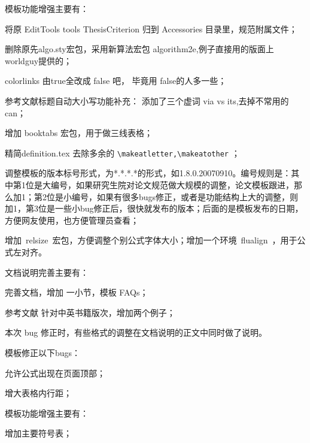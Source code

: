 模板功能增强主要有：
\begin{hitlist}
  \item 将原 EditTools tools ThesisCriterion 归到 Accessories 目录里，规范附属文件；
  \item 删除原先algo.sty宏包，采用新算法宏包 algorithm2e,例子直接用的版面上worldguy提供的；
  \item colorlinks 由true全改成 false 吧， 毕竟用 false的人多一些；
  \item 参考文献标题自动大小写功能补充： 添加了三个虚词 via vs its,去掉不常用的 can；
  \item 增加 booktabs 宏包，用于做三线表格；
  \item 精简definition.tex 去除多余的 \verb|\makeatletter,\makeatother| ；
  \item 调整模板的版本标号形式，为*.*.*.*的形式，如1.8.0.20070910。编号规则是：其中第1位是大编号，如果研究生院对论文规范做大规模的调整，论文模板跟进，那么加1；第2位是小编号，如果有很多bugs修正，或者是功能结构上大的调整，则加1，第3位是一些小bug修正后，很快就发布的版本；后面的是模板发布的日期，方便网友使用，也方便管理员查看；
  \item 增加~relsize~宏包，方便调整个别公式字体大小；增加一个环境~flualign~，用于公式左对齐。
\end{hitlist}

文档说明完善主要有：
\begin{hitlist}
  \item 完善文档，增加 一小节，模板 FAQs；
  \item 参考文献 针对中英书籍版次，增加两个例子；
  \item 本次 bug 修正时，有些格式的调整在文档说明的正文中同时做了说明。
\end{hitlist}


模板修正以下bugs：
\begin{hitlist}
    \item 允许公式出现在页面顶部；
    \item 增大表格内行距；
\end{hitlist}


模板功能增强主要有：
\begin{hitlist}
    \item 增加主要符号表；
\end{hitlist}

